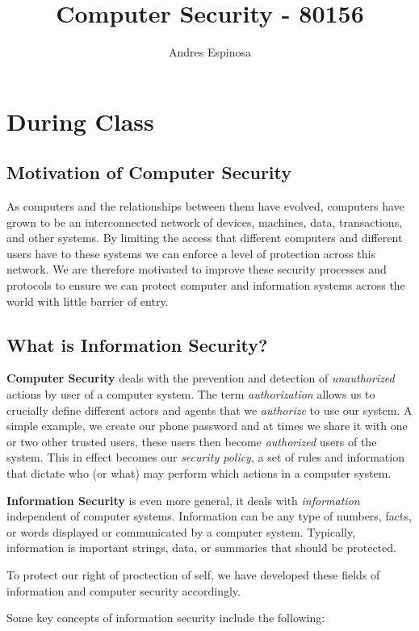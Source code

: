 \documentclass[11pt]{article}
\title{Computer Security - 80156}
\author{Andres Espinosa}
\begin{document}
\pgfplotsset{compat=1.18}
\maketitle

\tableofcontents

\section{During Class}
\subsection{Motivation of Computer Security}
As computers and the relationships between them have evolved, computers have grown to be an interconnected network of devices, machines, data, transactions, and other systems.
By limiting the access that different computers and different users have to these systems we can enforce a level of protection across this network.
We are therefore motivated to improve these security processes and protocols to ensure we can protect computer and information systems across the world with little barrier of entry.

\subsection{What is Information Security?}
\textbf{Computer Security} deals with the prevention and detection of \textit{unauthorized} actions by user of a computer system.
The term \textit{authorization} allows us to crucially define different actors and agents that we \textit{authorize} to use our system.
A simple example, we create our phone password and at times we share it with one or two other trusted users, these users then become \textit{authorized} users of the system.
This in effect becomes our \textit{security policy}, a set of rules and information that dictate who (or what) may perform which actions in a computer system.

\textbf{Information Security} is even more general, it deals with \textit{information} independent of computer systems.
Information can be any type of numbers, facts, or words displayed or communicated by a computer system.
Typically, information is important strings, data, or summaries that should be protected. 

To protect our right of proctection of self, we have developed these fields of information and computer security accordingly.

Some key concepts of information security include the following:
\end{document}
